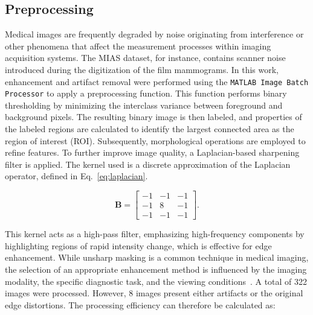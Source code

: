 \documentclass[runningheads]{llncs}
\begin{document}
\subsection{Preprocessing}
\label{sec:preprocessing}

Medical images are frequently degraded by noise originating from
interference or other phenomena that affect the measurement processes
within imaging acquisition systems. The \ac{MIAS} dataset, for
instance, contains scanner noise introduced during the digitization of
the film mammograms. In this work, enhancement and artifact removal were
performed using the \texttt{MATLAB Image Batch Processor} to apply a
preprocessing function. This function performs binary thresholding by
minimizing the interclass variance between foreground and background
pixels. The resulting binary image is then labeled, and properties of
the labeled regions are calculated to identify the largest connected
area as the region of interest (ROI). Subsequently, morphological
operations are employed to refine features. To further improve image
quality, a Laplacian-based sharpening filter is applied. The kernel
used is a discrete approximation of the Laplacian operator, defined in
Eq.~\eqref{eq:laplacian}.

\begin{equation}
  \label{eq:laplacian}
\mathbf{B} =
\begin{bmatrix}
-1 & -1 & -1 \\
-1 & 8  & -1 \\
-1 & -1 & -1
\end{bmatrix}.
\end{equation}


This kernel acts as a high-pass filter, emphasizing high-frequency
components by highlighting regions of rapid intensity change, which is
effective for edge enhancement. While unsharp masking is a common
technique in medical imaging, the selection of an appropriate
enhancement method is influenced by the imaging modality, the specific
diagnostic task, and the viewing
conditions~\cite{maini2010comprehensivereviewimageenhancement}. A
total of 322 images were processed. However, 8 images present either
artifacts or the original edge distortions. The processing efficiency
can therefore be calculated as:
\end{document}
